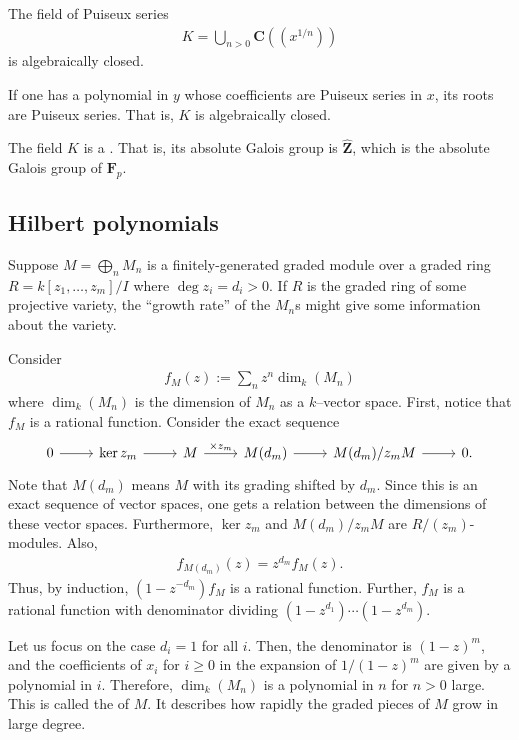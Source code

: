 \documentclass [11 pt, oneside, margin = 1 in] {article}
\begin{document}
\begin{corollary}[ ]\label{}\text{}
The field of Puiseux series 
\begin{align*}
	K = \bigcup_{n>0} \mathbf{C} (\!(x^{1/n})\!)
\end{align*}
is algebraically closed.
\end{corollary}

If one has a polynomial in $y$ whose coefficients are Puiseux series in $x$, its roots are Puiseux series. That is, $K$ is algebraically closed.

The field $K$ is a . That is, its absolute Galois group is $\widehat{\mathbf{Z}}$, which is the absolute Galois group of $\mathbf{F}_{p}$.

\subsection{Hilbert polynomials}
Suppose $M=\bigoplus_{n}M_n$ is a finitely-generated graded module over a graded ring $R = k[z_1,\hdots, z_m]/I$ where $\deg z_i = d_i >0$. If $R$ is the graded ring of some projective variety, the ``growth rate'' of the $M_n$s might give some information about the variety.

Consider
\begin{align*}
	f_M(z) :=  \sum_{n}^{} z^n\dim_k(M_n)
\end{align*}
where $\dim_k(M_n)$ is the dimension of $M_n$ as a $k$--vector space. First, notice that $f_M$ is a rational function. Consider the exact sequence
\[
\begin{tikzcd}
	0\ar[r]&\ker z_m \ar[r] & M \ar[r,"\times z_m"]& M(d_m) \ar[r] & M(d_m)/z_m M \ar[r]& 0. 
\end{tikzcd}
\]
Note that $M(d_m)$ means $M$ with its grading shifted by $d_m$. Since this is an exact sequence of vector spaces, one gets a relation between the dimensions of these vector spaces. Furthermore, $\ker z_m$ and $M(d_m)/z_m M$ are $R/(z_m)$-modules. Also,
\begin{align*}
	f_{M(d_m)}(z) = z^{d_m} f_M(z).
\end{align*}
Thus, by induction, $(1-z^{-d_m})f_M$ is a rational function. Further, $f_M$ is a rational function with denominator dividing $(1-z^{d_1})\cdots(1-z^{d_m})$.

Let us focus on the case $d_i=1$ for all $i$. Then, the denominator is $(1-z)^m$, and the coefficients of $x_i$ for $i\ge 0$ in the expansion of $1/(1-z)^m$ are given by a polynomial in $i$. Therefore, $\dim_k (M_n)$ is a polynomial in $n$ for $n>0$ large. This is called the  of $M$. It describes how rapidly the graded pieces of $M$ grow in large degree.
\end{document}
